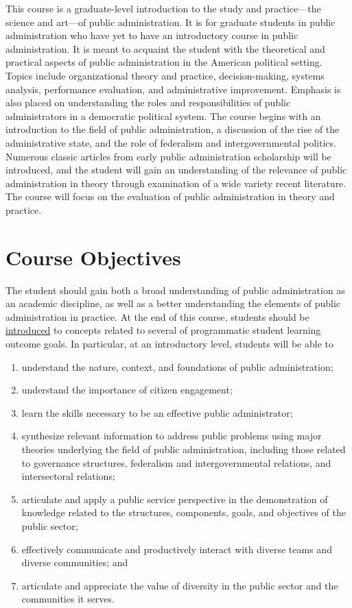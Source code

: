 \documentclass[10pt, letterpaper]{article}
\begin{document}
This course is a graduate-level introduction to the study and practice---the science and art---of public administration. It is for graduate students in public administration who have yet to have an introductory course in public administration. It is meant to acquaint the student with the theoretical and practical aspects of public administration in the American political setting. Topics include organizational theory and practice, decision-making, systems analysis, performance evaluation, and administrative improvement. Emphasis is also placed on understanding the roles and responsibilities of public administrators in a democratic political system.
\baselineskip
\noindent The course begins with an introduction to the field of public administration, a discussion of the rise of the administrative state, and the role of federalism and intergovernmental politics. Numerous classic articles from early public administration scholarship will be introduced, and the student will gain an understanding of the relevance of public administration in theory through examination of a wide variety recent literature. The course will focus on the evaluation of public administration in theory and practice.

\section*{Course Objectives}

The student should gain both a broad understanding of public administration as an academic discipline, as well as a better understanding the elements of public administration in practice. At the end of this course, students should be \underline{introduced} to concepts related to several of programmatic student learning outcome goals. In particular, at an introductory level, students will be able to 
	\begin{enumerate}
		\item understand the nature, context, and foundations of public administration;
		\item understand the importance of citizen engagement;
		\item learn the skills necessary to be an effective public administrator;
		\item synthesize relevant information to address public problems using major theories underlying the field of public administration, including those related to governance structures, federalism and intergovernmental relations, and intersectoral relations; 
		\item articulate and apply a public service perspective in the demonstration of knowledge related to the structures, components, goals, and objectives of the public sector; 
		\item effectively communicate and productively interact with diverse teams and diverse communities; and 
		\item articulate and appreciate the value of diversity in the public sector and the communities it serves.
	\end{enumerate}
\end{document}
